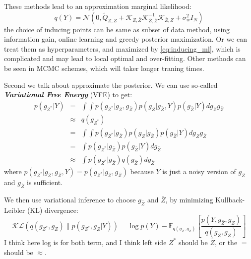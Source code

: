 \documentclass[10pt]{elegantbook}
\newcommand{\mydefination}[1]{\textbf{\textit{\textcolor{structurecolor}{#1}}}}
\begin{document}
These methods lead to an approximation marginal likelihood:
\begin{equation} \label{eq:inducing_ml}
    q(Y) = \mathcal N(0, \tilde Q_{Z, Z} + \mathscr{K}_{Z, \bar Z}\mathscr{K}_{\bar Z, \bar Z}^{-1}\mathscr{K}_{\bar Z, Z} + \sigma^2_w I_N)
\end{equation}
the choice of inducing points can be same as subset of data method, using information gain, online learning and greedy posterior maximization.
Or we can treat them as hyperparameters, and maximized by \ref{eq:inducing_ml}, which is complicated and may lead to local optimal and over-fitting.
Other methods can be seen in MCMC schemes, which will taker longer traning times.

Second we talk about approximate the posterior. We can use so-called \mydefination{Variational Free Energy} (VFE) to get:
\begin{equation}
    \begin{array}{rll}
    p(g_{Z^*} | Y) &=& \int \int p(g_{Z^*} | g_{Z}, g_{\bar Z})p(g_{Z} | g_{\bar Z}, Y)p(g_{\bar Z} | Y)dg_{Z}g_{\bar Z} \\
    & \approx & q(g_{Z^*}) \\
    &=& \int \int p(g_{Z^*} | g_{\bar Z}) p(g_{Z} | g_{\bar Z}) p(g_{\bar Z} | Y)dg_{Z}g_{\bar Z} \\
    &=& \int p(g_{Z^*} | g_{\bar Z}) p(g_{\bar Z} | Y) dg_{\bar Z} \\
    &\approx & \int p(g_{Z^*} | g_{\bar Z}) q(g_{\bar Z}) dg_{\bar Z}
    \end{array}
\end{equation}
where $p(g_{Z^*} | g_{Z}, g_{\bar Z}, Y) = p(g_{Z^*} | g_{Z}, g_{\bar Z})$ because $Y$ is just a noisy version of $g_Z$ and 
$g_{\bar Z}$ is sufficient.

We then use variational inference to choose $g_{\bar Z}$ and $\bar Z$, by minimizing Kullback-Leibler (KL) divergence:
\[
    \mathcal{KL} \left ( q(g_{Z^{*}},g_{Z}) \| p(g_{Z^{*}},g_{Z}|Y) \right ) = \log p(Y) - \mathbb E_{q(g_{\bar Z},g_{Z})}
\left [ \frac{p(Y, g_{\bar Z},g_{Z})}{q(g_{\bar Z},g_{Z})} \right ]
\]
I think here log is for both term, and I think left side $Z^*$ should be $\bar Z$, or the $=$ should be $\approx$.
\end{document}
